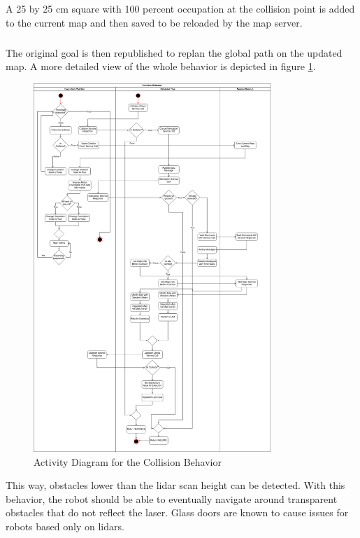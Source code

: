 A 25 by 25 cm square with 100 percent occupation at the collision point is added to the current map and then saved to be reloaded by the map server. 

\subparagraph*{}
The original goal is then republished to replan the global path on the updated map. A more detailed view of the whole behavior is depicted in figure \ref{fig:activity_diagram_collision}.

\begin{figure}[ht]
	\includegraphics[width=0.8\textwidth]{images/activity_diagram_collision.png}
	\caption{Activity Diagram for the Collision Behavior}
	\label{fig:activity_diagram_collision}
\end{figure}

This way, obstacles lower than the lidar scan height can be detected. With this behavior, the robot should be able to eventually navigate around transparent obstacles that do not reflect the laser. Glass doors are known to cause issues for robots based only on lidars. 


